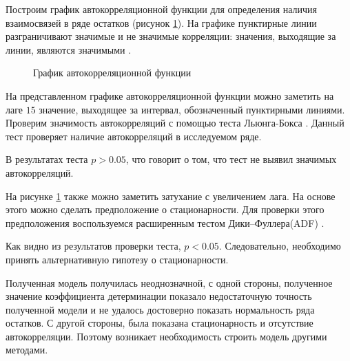 Построим график автокорреляционной функции для определения наличия взаимосвязей в ряде остатков (рисунок \ref{img:resid_acf}). На графике пунктирные линии разграничивают значимые и не значимые корреляции: значения, выходящие за линии, являются значимыми \cite[с.376]{Teetor2011R}.
\begin{figure}[ht]
\caption{График автокорреляционной функции}
\label{img:resid_acf}
\end{figure}
На представленном графике автокорреляционной функции можно заметить на лаге $15$ значение, выходящее за интервал, обозначенный пунктирными линиями. Проверим значимость автокорреляций с помощью теста Льюнга-Бокса \cite[с.377-378]{Teetor2011R}. Данный тест проверяет наличие автокорреляций в исследуемом ряде.

В результатах теста $p > 0.05$, что говорит о том, что тест не выявил значимых автокорреляций.

На рисунке \ref{img:resid_acf} также можно заметить затухание с увеличением лага. На основе этого можно сделать предположение о стационарности. Для проверки этого предположения воспользуемся расширенным тестом Дики--Фуллера(ADF) \cite{Dickey1979Distribution}. 

Как видно из результатов проверки теста, $p < 0.05$. Следовательно, необходимо принять альтернативную гипотезу о стационарности.

Полученная модель получилась неоднозначной, с одной стороны, полученное значение коэффициента детерминации показало недостаточную точность полученной модели и не удалось достоверно показать нормальность ряда остатков. С другой стороны, была показана стационарность и отсутствие автокорреляции. Поэтому возникает необходимость строить модель другими методами.

